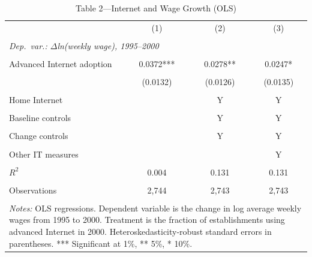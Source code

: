 \begin{table}[htbp]
\centering
\caption{Table 2---Internet and Wage Growth (OLS)}
\label{tab:table2}
\begin{tabular}{lccc}
\toprule
 & (1) & (2) & (3) \\\\
\midrule
\multicolumn{4}{l}{\textit{Dep.\ var.: $\Delta$ln(weekly wage), 1995--2000}} \\\\
\addlinespace
Advanced Internet adoption & 0.0372*** & 0.0278** & 0.0247* \\\\
 & (0.0132) & (0.0126) & (0.0135) \\\\
\addlinespace
Home Internet & & Y & Y \\\\
Baseline controls & & Y & Y \\\\
Change controls & & Y & Y \\\\
Other IT measures & & & Y \\\\
\addlinespace
$R^2$ & 0.004 & 0.131 & 0.131 \\\\
Observations & 2,744 & 2,743 & 2,743 \\\\
\bottomrule
\multicolumn{4}{p{0.85\linewidth}}{\footnotesize
 \textit{Notes:} OLS regressions. Dependent variable is the change in
 log average weekly wages from 1995 to 2000. Treatment is the fraction
 of establishments using advanced Internet in 2000.
 Heteroskedasticity-robust standard errors in parentheses.
 *** Significant at 1\%, ** 5\%, * 10\%.}
\end{tabular}
\end{table}
